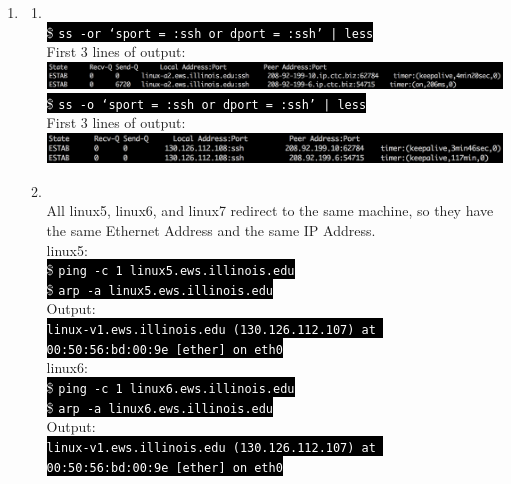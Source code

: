 \documentclass[10pt, a4paper]{article}
\begin{document}
\begin{enumerate}
\item\mbox{}
    \begin{enumerate}
    \item\mbox{}\\
        \colorbox{black}{\textcolor{white}{\$ \texttt{ss -or `sport = :ssh or dport = :ssh' | less}}}\\
        First 3 lines of output:\\
        \includegraphics[width=6.5in]{images/ss_output}\\

        \colorbox{black}{\textcolor{white}{\$ \texttt{ss -o `sport = :ssh or dport = :ssh' | less}}}\\
        First 3 lines of output:\\
        \includegraphics[width=6.5in]{images/ss_output_ip}
    \item\mbox{}\\
        All linux5, linux6, and linux7 redirect to the same machine, so they have the same Ethernet Address and the same IP Address.\\

        linux5:\\
        \colorbox{black}{\textcolor{white}{\$ \texttt{ping -c 1 linux5.ews.illinois.edu}}}\\
        \colorbox{black}{\textcolor{white}{\$ \texttt{arp -a linux5.ews.illinois.edu}}}\\
        Output:\\
        \colorbox{black}{\textcolor{white}{\texttt{linux-v1.ews.illinois.edu (130.126.112.107) at 00:50:56:bd:00:9e [ether] on eth0}}}\\

        linux6:\\
        \colorbox{black}{\textcolor{white}{\$ \texttt{ping -c 1 linux6.ews.illinois.edu}}}\\
        \colorbox{black}{\textcolor{white}{\$ \texttt{arp -a linux6.ews.illinois.edu}}}\\
        Output:\\
        \colorbox{black}{\textcolor{white}{\texttt{linux-v1.ews.illinois.edu (130.126.112.107) at 00:50:56:bd:00:9e [ether] on eth0}}}\\


\end{enumerate}
\end{enumerate}
\end{document}
